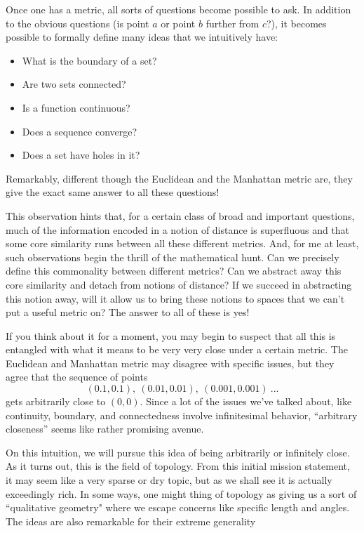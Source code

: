 \documentclass{report}
\begin{document}
Once one has a metric, all sorts of questions become possible to ask. In addition to the obvious questions (is point $a$ or point $b$ further from $c$?), it becomes possible to formally define many ideas that we intuitively have:

\begin{itemize}
\item What is the boundary of a set?
\item Are two sets connected?
\item Is a function continuous?
\item Does a sequence converge?
\item Does a set have holes in it?
\end{itemize}

Remarkably, different though the Euclidean and the Manhattan metric are, they give the exact same answer to all these questions!

This observation hints that, for a certain class of broad and important questions, much of the information encoded in a notion of distance is superfluous and that some core similarity runs between all these different metrics. And, for me at least, such observations begin the thrill of the mathematical hunt. Can we precisely define this commonality between different metrics? Can we abstract away this core similarity and detach from notions of distance? If we succeed in abstracting this notion away, will it allow us to bring these notions to spaces that we can't put a useful metric on? The answer to all of these is yes!

If you think about it for a moment, you may begin to suspect that all this is entangled with what it means to be very very close under a certain metric. The Euclidean and Manhattan metric may disagree with specific issues, but they agree that the sequence of points $$(0.1,0.1), ~ (0.01,0.01), ~ (0.001,0.001) ~...$$ gets arbitrarily close to $(0,0)$. Since a lot of the issues we've talked about, like continuity, boundary, and connectedness involve infinitesimal behavior, ``arbitrary closeness'' seems like rather promising avenue.

On this intuition, we will pursue this idea of being arbitrarily or infinitely close. As it turns out, this is the field of topology. From this initial mission statement, it may seem like a very sparse or dry topic, but as we shall see it is actually exceedingly rich. In some ways, one might thing of topology as giving us a sort of ``qualitative geometry" where we escape concerns like specific length and angles. The ideas are also remarkable for their extreme generality
\end{document}
